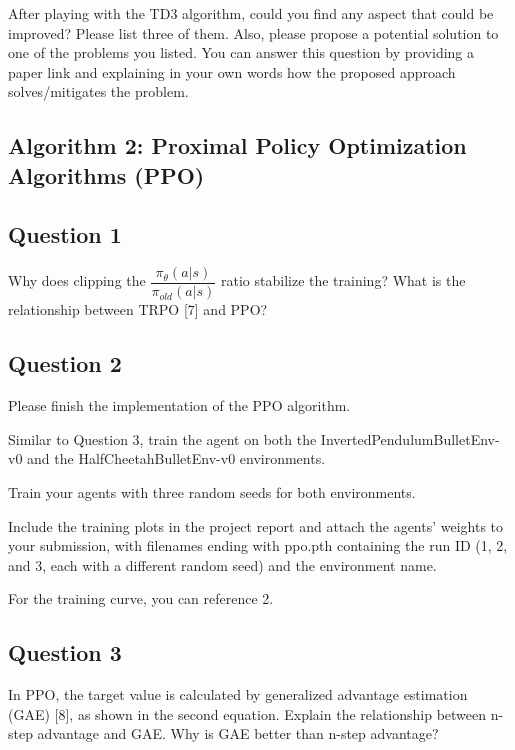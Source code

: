 \documentclass[12pt]{article}
\begin{document}
After playing with the TD3 algorithm, could you find any aspect that could be improved? Please
list three of them. Also, please propose a potential solution to one of the problems you listed.
You can answer this question by providing a paper link and explaining in your own words how
the proposed approach solves/mitigates the problem.


\subsection*{Algorithm 2: Proximal Policy Optimization Algorithms (PPO)}

\subsection*{Question 1}

Why does clipping the $\dfrac{\pi_{\theta}(a|s)}{\pi_{old}(a|s)}$ ratio stabilize the training? What is the relationship between TRPO [7] and PPO?

\subsection*{Question 2}

Please finish the implementation of the PPO algorithm.
\newline

\noindent
Similar to Question 3, train the agent on both the InvertedPendulumBulletEnv-v0 and the HalfCheetahBulletEnv-v0 environments.
\newline

\noindent
Train your agents with three random seeds for both environments. 
\newline

\noindent
Include the training plots in the project report and attach the agents’ weights to your submission, with filenames ending with ppo.pth containing the run ID (1, 2, and 3, each with a different random seed) and the environment name. 
\newline

\noindent
For the training curve, you can reference 2. 



\subsection*{Question 3}

In PPO, the target value is calculated by generalized advantage estimation (GAE) [8], 
as shown in the second equation. Explain the relationship between n-step advantage and GAE. 
Why is GAE better than n-step advantage?
\end{document}
